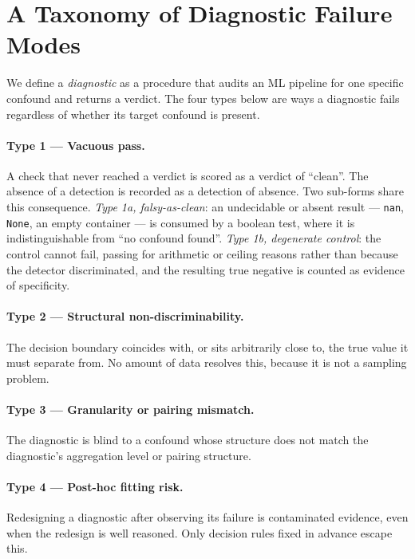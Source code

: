 \documentclass[pmlr,twocolumn,10pt]{jmlr}
\begin{document}
\section{A Taxonomy of Diagnostic Failure Modes}
\label{sec:taxonomy}

We define a \emph{diagnostic} as a procedure that audits an ML pipeline for one
specific confound and returns a verdict. The four types below are ways a
diagnostic fails regardless of whether its target confound is present.

\paragraph{Type 1 --- Vacuous pass.} A check that never reached a verdict is
scored as a verdict of ``clean''. The absence of a detection is recorded as a
detection of absence. Two sub-forms share this consequence.
\emph{Type 1a, falsy-as-clean}: an undecidable or absent result --- \texttt{nan},
\texttt{None}, an empty container --- is consumed by a boolean test, where it is
indistinguishable from ``no confound found''.
\emph{Type 1b, degenerate control}: the control cannot fail, passing for
arithmetic or ceiling reasons rather than because the detector discriminated,
and the resulting true negative is counted as evidence of specificity.

\paragraph{Type 2 --- Structural non-discriminability.} The decision boundary
coincides with, or sits arbitrarily close to, the true value it must separate
from. No amount of data resolves this, because it is not a sampling problem.

\paragraph{Type 3 --- Granularity or pairing mismatch.} The diagnostic is blind
to a confound whose structure does not match the diagnostic's aggregation level
or pairing structure.

\paragraph{Type 4 --- Post-hoc fitting risk.} Redesigning a diagnostic after
observing its failure is contaminated evidence, even when the redesign is well
reasoned. Only decision rules fixed in advance escape this.
\end{document}
